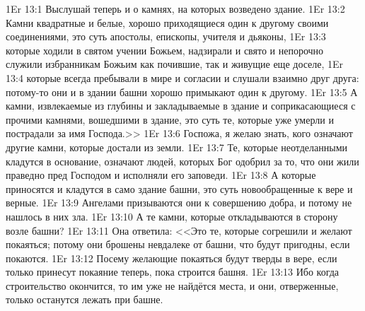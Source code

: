 \vs 1Er 13:1
Выслушай теперь и о камнях, на которых возведено здание.
\vs 1Er 13:2
Камни квадратные и белые,
хорошо приходящиеся один к другому своими соединениями,
это суть апостолы, епископы, учителя и дьяконы,
\vs 1Er 13:3
которые ходили в святом учении Божьем,
надзирали и свято и непорочно служили
избранникам Божьим как почившие, так и живущие еще доселе,
\vs 1Er 13:4
которые всегда пребывали в мире и согласии
и слушали взаимно друг друга: потому-то они и в здании башни
хорошо примыкают один к другому.
\vs 1Er 13:5
А камни, извлекаемые из
глубины и закладываемые в здание и соприкасающиеся с прочими камнями,
вошедшими в здание, это суть те,
которые уже умерли и пострадали за имя Господа.>>
\vs 1Er 13:6
Госпожа, я желаю знать, кого означают другие камни,
которые достали из земли.
\vs 1Er 13:7
Те, которые неотделанными
кладутся в основание, означают людей, которых Бог одобрил за то, что они жили
праведно пред Господом и исполняли его заповеди.
\vs 1Er 13:8
А которые приносятся и
кладутся в само здание башни, это суть новообращенные к вере и верные.
\vs 1Er 13:9
Ангелами призываются они к
совершению добра, и потому не нашлось в них зла.
\vs 1Er 13:10
А те камни, которые откладываются в сторону возле башни?
\vs 1Er 13:11
Она ответила:
<<Это те, которые согрешили и желают покаяться;
потому они брошены невдалеке от башни,
что будут пригодны, если покаются.
\vs 1Er 13:12
Посему желающие покаяться
будут тверды в вере, если только принесут покаяние теперь,
пока строится башня.
\vs 1Er 13:13
Ибо когда строительство окончится,
то им уже не найдётся места, и они, отверженные,
только останутся лежать при башне.

